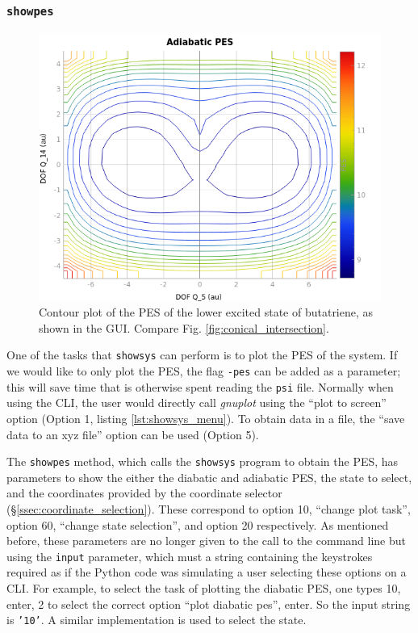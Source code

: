 \documentclass[12pt]{article}
\begin{document}
\subsubsection{\texttt{showpes}}\label{sssec:showpes}

\begin{figure}
    \includegraphics[width=\linewidth]{img/but_pes_gui.png} 
    \caption{Contour plot of the PES of the lower excited state of butatriene, as shown in the GUI. Compare Fig. \ref{fig:conical_intersection}.}
    \label{fig:but_pes_gui}
    \end{figure}

One of the tasks that \texttt{showsys} can perform is to plot the PES of the system. If we would like to only plot the PES, the flag \texttt{-pes} can be added as a parameter; this will save time that is otherwise spent reading the \texttt{psi} file. Normally when using the CLI, the user would directly call \textit{gnuplot} using the ``plot to screen'' option (Option 1, listing \ref{lst:showsys_menu}). To obtain data in a file, the ``save data to an xyz file'' option can be used (Option 5).

The \texttt{showpes} method, which calls the \texttt{showsys} program to obtain the PES, has parameters to show the either the diabatic and adiabatic PES, the state to select, and the coordinates provided by the coordinate selector (\S\ref{ssec:coordinate_selection}). These correspond to option 10, ``change plot task'', option 60, ``change state selection'', and option 20 respectively. As mentioned before, these parameters are no longer given to the call to the command line but using the \texttt{input} parameter, which must a string containing the keystrokes required as if the Python code was simulating a user selecting these options on a CLI. For example, to select the task of plotting the diabatic PES, one types 10, enter, 2 to select the correct option ``plot diabatic pes'', enter. So the input string is \texttt{'10\n'}. A similar implementation is used to select the state.
\end{document}
